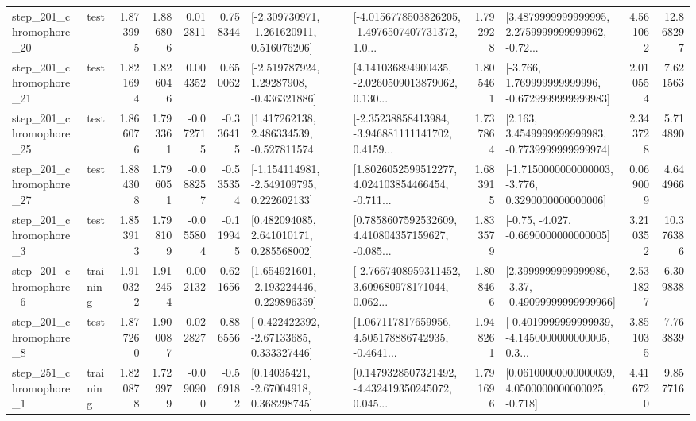 \begin{tabular}{llrrrrllrlrr}
  step\_201\_chromophore\_20 &      test &      1.873995 &    1.886806 &      0.012811 &  0.758344 &   [-2.309730971, -1.261620911, 0.516076206] &  [-4.0156778503826205, -1.4976507407731372, 1.0... &       1.792928 &  [3.4879999999999995, 2.2759999999999962, -0.72... &            4.561062 &         12.868297 \\
  step\_201\_chromophore\_21 &      test &      1.821694 &    1.826046 &      0.004352 &  0.650062 &    [-2.519787924, 1.29287908, -0.436321886] &  [4.141036894900435, -2.0260509013879062, 0.130... &       1.805461 &   [-3.766, 1.769999999999996, -0.6729999999999983] &            2.010554 &          7.621563 \\
  step\_201\_chromophore\_25 &      test &      1.866076 &    1.793361 &     -0.072715 & -0.336415 &    [1.417262138, 2.486334539, -0.527811574] &  [-2.35238858413984, -3.946881111141702, 0.4159... &       1.737864 &   [2.163, 3.4549999999999983, -0.7739999999999974] &            2.343728 &          5.714890 \\
  step\_201\_chromophore\_27 &      test &      1.884308 &    1.796051 &     -0.088257 & -0.535354 &   [-1.154114981, -2.549109795, 0.222602133] &  [1.8026052599512277, 4.024103854466454, -0.711... &       1.683915 &  [-1.7150000000000003, -3.776, 0.3290000000000006] &            0.069009 &          4.644966 \\
   step\_201\_chromophore\_3 &      test &      1.853913 &    1.798109 &     -0.055804 & -0.119945 &     [0.482094085, 2.641010171, 0.285568002] &  [0.7858607592532609, 4.410804357159627, -0.085... &       1.833579 &               [-0.75, -4.027, -0.6690000000000005] &            3.210352 &         10.376386 \\
   step\_201\_chromophore\_6 &  training &      1.910322 &    1.912454 &      0.002132 &  0.621656 &   [1.654921601, -2.193224446, -0.229896359] &  [-2.7667408959311452, 3.609680978171044, 0.062... &       1.808466 &  [2.3999999999999986, -3.37, -0.49099999999999966] &            2.531827 &          6.309838 \\
   step\_201\_chromophore\_8 &      test &      1.877260 &    1.900087 &      0.022827 &  0.886556 &    [-0.422422392, -2.67133685, 0.333327446] &  [1.067117817659956, 4.505178886742935, -0.4641... &       1.948261 &  [-0.4019999999999939, -4.1450000000000005, 0.3... &            3.851035 &          7.763839 \\
   step\_251\_chromophore\_1 &  training &      1.820878 &    1.729979 &     -0.090900 & -0.569182 &      [0.14035421, -2.67004918, 0.368298745] &  [0.1479328507321492, -4.432419350245072, 0.045... &       1.791696 &  [0.06100000000000039, 4.0500000000000025, -0.718] &            4.416720 &          9.857716 \\

\end{tabular}
